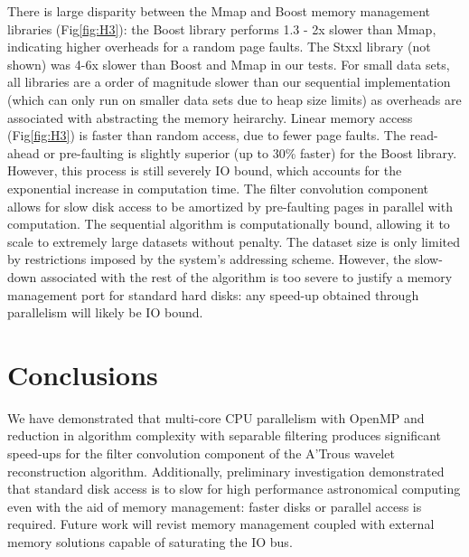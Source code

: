 \documentclass[11pt, twoside]{article}
\begin{document}
There is large disparity between the Mmap and Boost memory management libraries (Fig\ref{fig:H3}): the Boost library performs  1.3 - 2x slower than Mmap, indicating higher overheads for a random page faults.   The Stxxl library (not shown) was 4-6x slower than Boost and Mmap in our tests.
For small data sets, all libraries are a order of magnitude slower than our sequential implementation (which can only run on smaller data sets due to heap size limits) as overheads are associated with
abstracting the memory heirarchy.
Linear memory access (Fig\ref{fig:H3}) is faster than random access, due to fewer page faults. The read-ahead or pre-faulting is slightly superior (up to 30\% faster) for the Boost library. However, this process is still severely IO bound,  which accounts for the exponential increase in computation time.
The filter convolution component allows for slow disk access to be amortized by pre-faulting pages in parallel with computation. 
The sequential algorithm is  computationally bound, allowing it to scale to extremely large datasets without penalty. The dataset size is only limited by restrictions imposed by the system's addressing scheme. 
However, the slow-down associated with the rest of the algorithm is too severe to justify a memory management port for standard hard disks:
any speed-up obtained through parallelism will likely be IO bound.

\section{Conclusions}

We have demonstrated that multi-core CPU parallelism with OpenMP and reduction in algorithm complexity with separable filtering produces significant speed-ups
for the filter convolution component of the A'Trous wavelet reconstruction algorithm. Additionally, preliminary investigation demonstrated
that standard disk access is to slow for high performance astronomical computing even with the aid of memory management: faster disks or parallel access is required.  Future work will revist memory management coupled with external memory solutions capable of saturating the IO bus.
\end{document}
